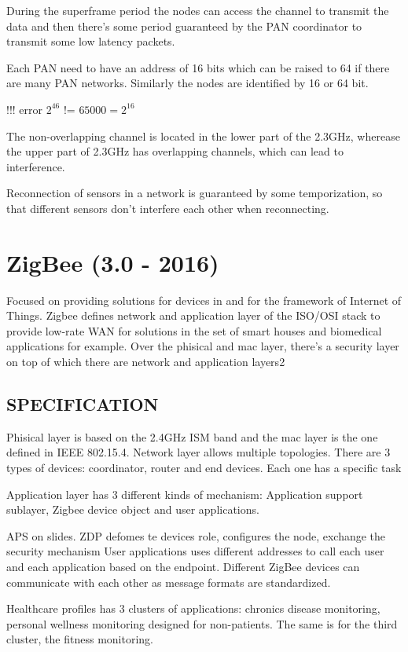 During the superframe period the nodes can access the channel to transmit the data and then there's  some period guaranteed by the PAN coordinator to transmit some low latency packets.

Each PAN need to have an address of 16 bits which can be raised to 64 if there are many PAN networks. Similarly the nodes are identified by 16 or 64 bit.

!!! error
$2^46$ != $65000 = 2^16$

The non-overlapping channel is located in the lower part of the 2.3GHz, wherease the upper part of 2.3GHz has overlapping channels, which can lead to interference.

Reconnection of sensors in a network is guaranteed by some temporization, so that different sensors don't interfere each other when reconnecting.

\section{ZigBee (3.0 - 2016)}
Focused on providing solutions for devices in and for the framework of Internet of Things.
Zigbee defines network and application layer of the ISO/OSI stack to provide low-rate WAN for solutions in the set of smart houses and biomedical applications for example.
Over the phisical and mac layer, there's a security layer on top of which there are  network and application layers2

\subsection{SPECIFICATION}
Phisical layer is based on the 2.4GHz ISM band and the mac layer is the one defined in IEEE 802.15.4. Network layer allows multiple topologies. There are 3 types of devices: coordinator, router and end devices. Each one has a specific task

Application layer has 3 different kinds of mechanism:
Application support sublayer, Zigbee device object and user applications.

APS on slides.
ZDP defomes te devices role, configures the node, exchange the security mechanism
User applications uses different addresses to call each user and each application based on the endpoint.
Different ZigBee devices can communicate with each other as message formats are standardized.

Healthcare profiles has 3 clusters of applications: chronics disease monitoring, personal wellness monitoring designed for non-patients. The same is for the third cluster, the fitness monitoring.

